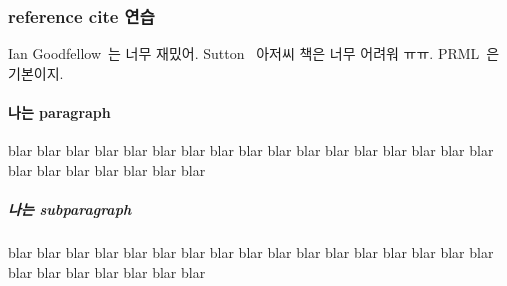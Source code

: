 \documentclass[a4paper,11pt]{article}
\begin{document}
\subsubsection{reference cite 연습}
Ian Goodfellow~\cite{Goodfellow2015}는 너무 재밌어.
Sutton~\cite{Sutton2018} 아저씨 책은 너무 어려워 ㅠㅠ.
PRML~\cite{Bishop2006}은 기본이지.



\paragraph{나는 paragraph}
blar blar blar blar blar blar blar blar
blar blar blar blar blar blar blar blar
blar blar blar blar blar blar blar blar

\subparagraph{나는 subparagraph}
blar blar blar blar blar blar blar blar
blar blar blar blar blar blar blar blar
blar blar blar blar blar blar blar blar


\newpage


\end{document}
